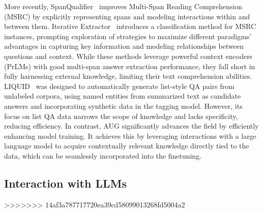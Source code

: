 More recently, SpanQualifier~\cite{huang2023qualifier} improves Multi-Span Reading Comprehension (MSRC) by explicitly representing spans and modeling interactions within and between them.
Iterative Extractor~\cite{zhang2023many} introduces a classification method for MSRC instances, prompting exploration of strategies to maximize different paradigms' advantages in capturing key information and modeling relationships between questions and context.
While these methods leverage powerful context encoders (PrLMs) with good multi-span answer extraction performance, they fall short in fully harnessing external knowledge, limiting their text comprehension abilities.
LIQUID~\cite{lee2023liquid} was designed to automatically generate list-style QA pairs from unlabeled corpora, using named entities from summarized text as candidate answers and incorporating synthetic data in the tagging model. However, its focus on list QA data narrows the scope of knowledge and lacks specificity, reducing efficiency.
In contrast, AUG significantly advances the field by efficiently enhancing model training. It achieves this by leveraging interactions with a large language model to acquire contextually relevant knowledge directly tied to the data, which can be seamlessly incorporated into the finetuning.


\subsection{Interaction with LLMs}
>>>>>>> 14af3a787717720ea39cd58099013268fd5004a2
